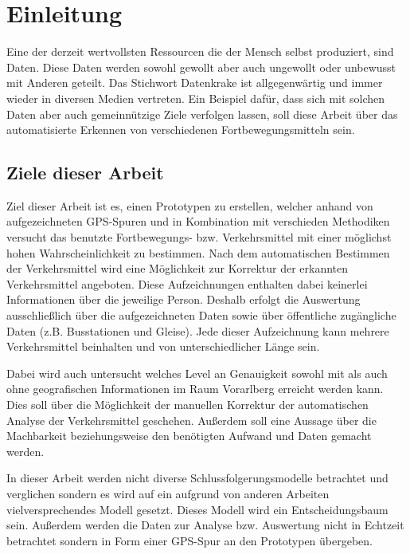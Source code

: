\chapter{Einleitung}
Eine der derzeit wertvollsten Ressourcen die der Mensch selbst produziert, sind Daten. Diese Daten werden sowohl  gewollt aber auch ungewollt oder unbewusst mit Anderen geteilt. Das Stichwort Datenkrake ist allgegenwärtig und immer wieder in diversen Medien vertreten. Ein Beispiel dafür, dass sich mit solchen Daten aber auch gemeinnützige Ziele verfolgen lassen, soll diese Arbeit über das automatisierte Erkennen von verschiedenen Fortbewegungsmitteln sein. 

\section{Ziele dieser Arbeit}
Ziel dieser Arbeit ist es, einen Prototypen zu erstellen, welcher anhand von aufgezeichneten GPS-Spuren und in Kombination mit verschieden Methodiken versucht das benutzte Fortbewegungs- bzw. Verkehrsmittel mit einer möglichst hohen Wahrscheinlichkeit zu bestimmen. Nach dem automatischen Bestimmen der Verkehrsmittel wird eine Möglichkeit zur Korrektur der erkannten Verkehrsmittel angeboten. Diese Aufzeichnungen enthalten dabei keinerlei Informationen über die jeweilige Person. Deshalb erfolgt die Auswertung ausschließlich über die aufgezeichneten Daten sowie über öffentliche zugängliche Daten (z.B. Busstationen und Gleise). Jede dieser Aufzeichnung kann mehrere Verkehrsmittel beinhalten und von unterschiedlicher Länge sein. 

Dabei wird auch untersucht welches Level an Genauigkeit sowohl mit als auch ohne geografischen Informationen im Raum Vorarlberg erreicht werden kann. Dies soll über die Möglichkeit der manuellen Korrektur der automatischen Analyse der Verkehrsmittel geschehen. Außerdem soll eine Aussage über die Machbarkeit beziehungsweise den benötigten Aufwand und Daten gemacht werden.

In dieser Arbeit werden nicht diverse Schlussfolgerungsmodelle betrachtet und verglichen sondern es wird auf ein aufgrund von anderen Arbeiten vielversprechendes Modell gesetzt. Dieses Modell wird ein Entscheidungsbaum sein. Außerdem werden die Daten zur Analyse bzw. Auswertung nicht in Echtzeit betrachtet sondern in Form einer GPS-Spur an den Prototypen übergeben.

